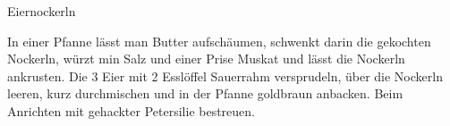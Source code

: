 \begin{recipe}{Eiernockerln}%

    \begin{ingredients}
        \entrysection{}
    \end{ingredients}

    \begin{instructions}
        In einer Pfanne lässt man Butter aufschäumen, schwenkt darin die gekochten Nockerln, würzt min Salz und einer Prise Muskat und lässt die Nockerln ankrusten.
        Die 3 Eier mit 2 Esslöffel Sauerrahm versprudeln, über die Nockerln leeren, kurz durchmischen und in der Pfanne goldbraun anbacken.
        Beim Anrichten mit gehackter Petersilie bestreuen.
    \end{instructions}
\end{recipe}
